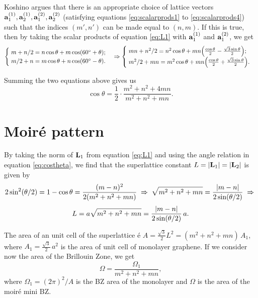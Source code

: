 \documentclass[a4paper,10pt]{article}
\begin{document}
Koshino \cite{koshino2012} argues that there is an appropriate choice of lattice vectors $\vb{a}_1^{(1)}, \vb{a}_2^{(1)}, \vb{a}_1^{(2)}, \vb{a}_2^{(2)}$ (satisfying equations \ref{eq:scalarprods1} to \ref{eq:scalarprods4}) such that the indices $(m',n')$ can be made equal to $(n,m)$. If this is true, then by taking the scalar products of equation \ref{eq:L1} with $\vb{a}_1^{(1)}$ and $\vb{a}_1^{(2)}$, we get
$$
\begin{cases}
\; m + n/2 = n \cos\theta + m \cos(60^\circ + \theta); \\
\; m/2 + n = m \cos\theta + n \cos(60^\circ - \theta).
\end{cases}
\Rightarrow
\begin{cases}
\; mn + n^2/2 = n^2 \cos\theta + mn \qty(\frac{\cos\theta}{2}
- \frac{\sqrt{3} \sin\theta}{2}); \\
\; m^2/2 + mn = m^2 \cos\theta + mn \qty(\frac{\cos\theta}{2}
+ \frac{\sqrt{3} \sin\theta}{2}).
\end{cases}
$$

Summing the two equations above gives us
\begin{equation} \label{eq:costheta}
\boxed{\cos\theta = \frac{1}{2} \cdot \frac{m^2 + n^2 + 4mn}{m^2 + n^2 + mn}.}
\end{equation}


\pagebreak

\section{Moiré pattern}

By taking the norm of $\vb{L}_1$ from equation \ref{eq:L1} and using the angle relation in equation \ref{eq:costheta}, we find that the superlattice constant $L = \abs{\vb{L}_1} = \abs{\vb{L}_2}$ is given by
$$
2\sin[2](\theta/2) = 1 - \cos\theta = \frac{(m-n)^2}{2(m^2+n^2+mn)} \; \Rightarrow \;
\sqrt{m^2+n^2+mn} = \frac{\abs{m-n}}{2\sin(\theta/2)} \; \Rightarrow \;
$$
\begin{equation} \label{eq:}
L = a\sqrt{m^2 + n^2 + mn} = \frac{\abs{m-n}}{2 \sin(\theta/2)} \, a.
\end{equation}

\n


The area of an unit cell of the superlattice é $A = \frac{\sqrt{3}}{2} L^2 = (m^2 + n^2 + mn) \, A_1$, where $A_1 = \frac{\sqrt{3}}{2} \, a^2$ is the area of unit cell of monolayer graphene. If we consider now the area of the Brillouin Zone, we get
\begin{equation} \label{eq:bz-volume}
\Omega = \frac{\Omega_1}{m^2 + n^2 + mn},
\end{equation}
where $\Omega_1 = (2\pi)^2/A$ is the BZ area of the monolayer and $\Omega$ is the area of the moiré mini BZ.
\end{document}
